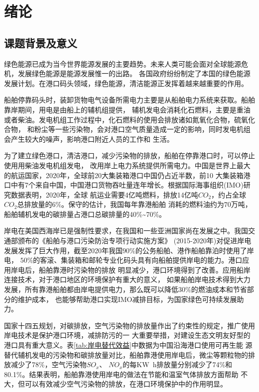 \chapter{绪论}

\section{课题背景及意义}
绿色能源已成为当今世界能源发展的主要趋势。未来人类可能会面对全球能源危机，发展绿色能源是能源发展惟一的出路。
各国政府纷纷制定了本国的绿色能源发展计划。在港口码头领域，绿色能源，清洁能源正发挥着越来越重要的作用。

船舶停靠码头时，装卸货物电气设备所需电力主要是从船舶电力系统来获取。船舶靠岸期间，用电是由船上的辅机组提供，
辅机发电会消耗化石燃料，主要是重油或者柴油。发电机组工作过程中，化石燃料的使用会排放诸如氮氧化合物，硫氧化合物，
和粉尘等一些污染物，会对港口空气质量造成一定的影响，同时发电机组会产生较大的噪声，影响港口附近人员的工作和
生活。

为了建立绿色港口，清洁港口，减少污染物的排放，船舶在停靠港口时，可以停止使用用柴油发电机组发电，
改用岸上电力系统提供所需电力。中国是世界上最大的航运国家，2020年，全球前20大集装箱港口中国仍占近半数，前10
大集装箱港口中有7个来自中国，中国港口货物吞吐量连年增长。根据国际海事组织(IMO)研究数据表明，2020年，全球
航运业需要4亿吨燃料，排放14亿吨$CO_{2}$，约占全球$CO_{2}$总排放量的$6\%$。保守的估计，我国每年靠港船舶
消耗的燃料油约为$70$万吨，船舶辅机发电的碳排量占港口总碳排量的40\%\~{}70\%\cite{SP1}。

岸电在美国西海岸已是强制性要求，在我国和一些亚洲国家尚在发展之中。我国交通部颁布的《船舶与港口污染防治专项行动实施方案》
(2015-2020年)对促进岸电发展发挥了巨大作用，截至2020年我国$90\%$的公务船舶、港作船舶靠泊时使用了岸电，
$50\%$的客滚、集装箱和邮轮专业化码头具有向船舶提供岸电的能力。港口应用岸电后，船舶靠港时污染物的排放
明显减少，港口环境得到了改善。应用船岸连接技术，对于港口地区的环境保护有重大的意义，
如果船舶岸电技术得到大力发展，所有靠港船舶都由岸电提供电力，那么既可以降低$30\%$的燃油成本\cite{SP2}和节省部分的维护成本，
也能够帮助港口实现IMO减排目标，为国家绿色可持续发展助力。

国家十四五规划，对碳排放，空气污染物的排放量作出了约束性的规定，推广使用岸电技术是保护港口环境，减排防污的一
大重要举措，对建设生态文明友好型的港口具有重大意义。表\ref{tab:岸电替代效益}中数据为中国沿海港口使用可再生能
源替代辅机发电的污染物和碳排放量对比，船舶靠港使用岸电后，微尘等颗粒物的排放减少了78\%，空气污染物$SO_{x}$、
$NO_{x}$的每\si{KW.h}排放量分别减少了74\%和80.1\%。结果表明，船舶靠港使用岸电的做法在节能和温室气体排放方面帮助
不大，但可以有效减少空气污染物的排放，在港口环境保护中的作用明显。

